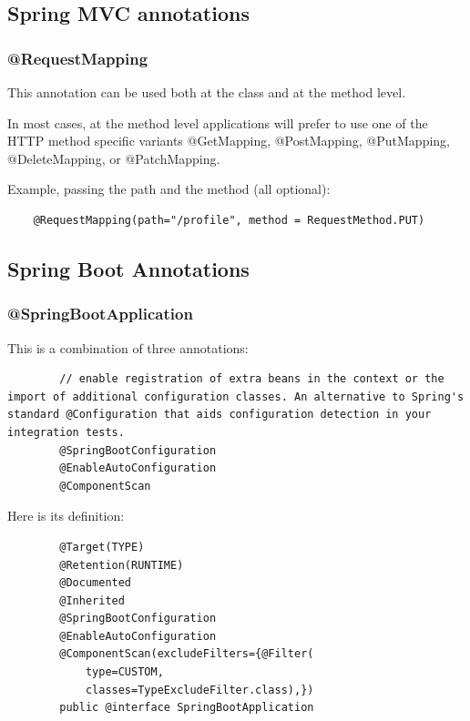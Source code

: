 \documentclass{scrartcl}
\begin{document}
\subsection{Spring MVC annotations}

\subsubsection{@RequestMapping}

This annotation can be used both at the class and at the method level.

In most cases, at the method level applications will prefer to use one of the HTTP method specific variants @GetMapping, @PostMapping, @PutMapping, @DeleteMapping, or @PatchMapping.

Example, passing the path and the method (all optional):

\begin{lstlisting}
    @RequestMapping(path="/profile", method = RequestMethod.PUT)
\end{lstlisting}

\subsection{Spring Boot Annotations}
\subsubsection{@SpringBootApplication}

    This is a combination of three annotations:

    \begin{lstlisting}
        // enable registration of extra beans in the context or the import of additional configuration classes. An alternative to Spring's standard @Configuration that aids configuration detection in your integration tests.
        @SpringBootConfiguration
        @EnableAutoConfiguration
        @ComponentScan
    \end{lstlisting}

 Here is its definition:

    \begin{lstlisting}
        @Target(TYPE)
        @Retention(RUNTIME)
        @Documented
        @Inherited
        @SpringBootConfiguration
        @EnableAutoConfiguration
        @ComponentScan(excludeFilters={@Filter(
            type=CUSTOM,
            classes=TypeExcludeFilter.class),})
        public @interface SpringBootApplication

    \end{lstlisting}
\end{document}
